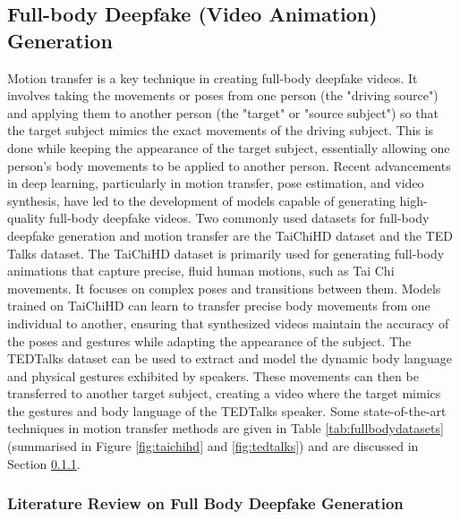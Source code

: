 \subsection{Full-body Deepfake (Video Animation) Generation}
\label{subsec:fullbody_generation}

Motion transfer is a key technique in creating full-body deepfake videos. It involves taking the movements or poses from one person (the "driving source") and applying them to another person (the "target" or "source subject") so that the target subject mimics the exact movements of the driving subject. This is done while keeping the appearance of the target subject, essentially allowing one person’s body movements to be applied to another person. Recent advancements in deep learning, particularly in motion transfer, pose estimation, and video synthesis, have led to the development of models capable of generating high-quality full-body deepfake videos. Two commonly used datasets for full-body deepfake generation and motion transfer are the TaiChiHD dataset and the TED Talks dataset. The TaiChiHD dataset is primarily used for generating full-body animations that capture precise, fluid human motions, such as Tai Chi movements. It focuses on complex poses and transitions between them. Models trained on TaiChiHD can learn to transfer precise body movements from one individual to another, ensuring that synthesized videos maintain the accuracy of the poses and gestures while adapting the appearance of the subject. The TEDTalks dataset can be used to extract and model the dynamic body language and physical gestures exhibited by speakers. These movements can then be transferred to another target subject, creating a video where the target mimics the gestures and body language of the TEDTalks speaker. Some state-of-the-art techniques in motion transfer methods are given in Table \ref{tab:fullbodydatasets} (summarised in Figure \ref{fig:taichihd} and \ref{fig:tedtalks}) and are discussed in Section \ref{subsubsec:fullbody_gen}.

\subsubsection{Literature Review on Full Body Deepfake Generation}
\label{subsubsec:fullbody_gen}

